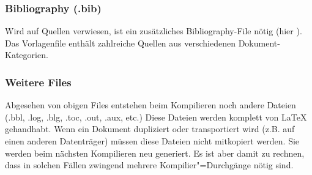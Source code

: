 \subsubsection{Bibliography (.bib)}%
%
Wird auf Quellen verwiesen, ist ein zusätzliches Bibliography-File nötig (hier ). Das Vorlagenfile enthält zahlreiche Quellen aus verschiedenen Dokument-Kategorien. %
%
\subsubsection{Weitere Files}%
%
Abgesehen von obigen Files entstehen beim Kompilieren noch andere Dateien (.bbl, .log, .blg, .toc, .out, .aux, etc.) Diese Dateien werden komplett von \LaTeX{} gehandhabt. Wenn ein Dokument dupliziert oder transportiert wird (z.B. auf einen anderen Datenträger) müssen diese Dateien nicht mitkopiert werden. Sie werden beim nächsten Kompilieren neu generiert. Es ist aber damit zu rechnen, dass in solchen Fällen zwingend mehrere Kompilier"=Durchgänge nötig sind.%
%
\newpage%
